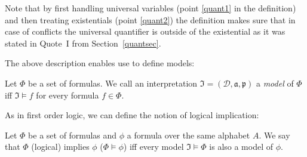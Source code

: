 \begin{definition}
\end{definition}

Note that by first handling universal variables (point \ref{quant1} in the definition) and then treating existentials (point \ref{quant2}) the definition makes sure 
that in case of conflicts the universal quantifier is outside of the existential as it was stated in Quote~I from Section~\ref{quantsec}.


The above description enables use to define models:

\begin{definition}[Model]
Let $\Phi$ be a set of \nthree formulas. We call an interpretation $\mathfrak{I}=(\mathcal{D},\mathfrak{a,p})$ a \textit{model} of $\Phi$ iff $\mathfrak{I}\models f$ for every formula $f\in \Phi$.
\end{definition}
%
As in first order logic, we can define the notion of logical implication:

\begin{definition}\label{log_impl}
Let $\Phi$ be a set of \nthree formulas  and $\phi$ a formula over the same \nthree alphabet $A$. We say that $\Phi$ (logical) implies 
$\phi$ ($\Phi \models \phi$) iff every
model $\mathfrak{I}\models \Phi$ is also a model of $\phi$.
\end{definition}







